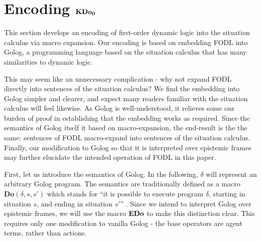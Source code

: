 \section{Encoding $\mathbf{KDo_{0}}$\label{sec:CKnowledge:Encoding-KDoZ}}

This section develops an encoding of first-order dynamic logic into
the situation calculus via macro expansion. Our encoding is based
on embedding FODL into Golog, a programming language based on the
situation calculus \citep{levesque97golog} that has many similarities
to dynamic logic.

This may seem like an unnecessary complication - why not expand FODL
directly into sentences of the situation calculus? We find the embedding
into Golog simpler and clearer, and expect many readers familiar with
the situation calculus will feel likewise. As Golog is well-understood,
it relieves some our burden of proof in establishing that the embedding
works as required. Since the semantics of Golog itself it based on
macro-expansion, the end-result is the the same: sentences of FODL
macro-expand into sentences of the situation calculus. Finally, our
modification to Golog so that it is interpreted over epistemic frames
may further elucidate the intended operation of FODL in this paper.

First, let us introduce the semantics of Golog. In the following,
$\delta$ will represent an arbitrary Golog program. The semantics
are traditionally defined as a macro $\mathbf{Do}(\delta,s,s')$ which
stands for {}``it is possible to execute program $\delta$, starting
in situation $s$, and ending in situation $s'$'' \citep{levesque97golog}.
Since we intend to interpret Golog over epistemic frames, we will
use the macro $\mathbf{EDo}$ to make this distinction clear. This requires
only one modification to vanilla Golog - the base operators are agent
terms, rather than actions.

